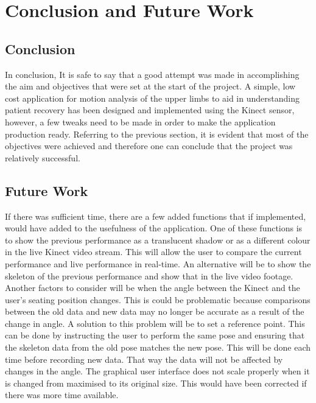 \documentclass[a4paper, 12pt]{article}
\begin{document}
\section{Conclusion and Future Work}

\subsection{Conclusion}
In conclusion, It is safe to say that a good attempt was made in accomplishing the aim and objectives that were set at the start of the project. A simple, low cost application for motion analysis of the upper limbs to aid in understanding patient recovery has been designed and implemented using the Kinect sensor, however, a few tweaks need to be made in order to make the application production ready. Referring to the previous section, it is evident that most of the objectives were achieved and therefore one can conclude that the project was relatively successful. 


\subsection{Future Work}

If there was sufficient time, there are a few added functions that if implemented, would have added to the usefulness of the application. One of these functions is to show the previous performance as a translucent shadow or as a different colour in the live Kinect video stream. This will allow the user to compare the current performance and live performance in real-time. An alternative will be to show the skeleton of the previous performance and show that in the live video footage. Another factors to consider will be when the angle between the Kinect and the user's seating position changes. This is could be problematic because comparisons between the old data and new data may no longer be accurate as a result of the change in angle. A solution to this problem will be to set a reference point. This can be done by instructing the user to perform the same pose and ensuring that the skeleton data from the old pose matches the new pose. This will be done each time before recording new data. That way the data will not be affected by changes in the angle. The graphical user interface does not scale properly when it is changed from maximised to its original size. This would have been corrected if there was more time available. 

\newpage



 
\end{document}
